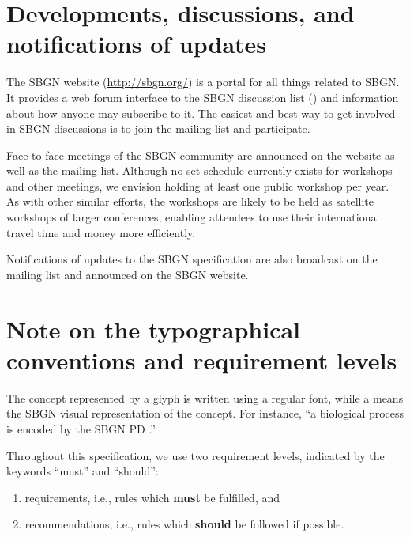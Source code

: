 \section{Developments, discussions, and notifications of updates}
\label{sec:discussions}

The SBGN website (\url{http://sbgn.org/}) is a portal for all things 
related to SBGN.  It provides a web forum interface to the SBGN discussion 
list () and information about how anyone 
may subscribe to it.  The easiest and best way to get involved in SBGN 
discussions is to join the mailing list and participate.

Face-to-face meetings of the SBGN community are announced on the website as 
well as the mailing list.  Although no set schedule currently exists for 
workshops and other meetings, we envision holding at least one public 
workshop per year.  As with other similar efforts, the workshops are likely 
to be held as satellite workshops of larger conferences, enabling attendees 
to use their international travel time and money more efficiently.

Notifications of updates to the SBGN specification are also broadcast on 
the mailing list and announced on the SBGN website.

\section{Note on the typographical conventions and requirement levels}
\label{sec:notes}
The concept represented by a glyph is written using a regular font, while a 
 means the SBGN visual representation of the concept. For 
instance, ``a biological process is encoded by the SBGN PD .''

Throughout this specification, we use two requirement levels, indicated by the keywords ``must'' and ``should'':
\begin{enumerate}
  \item requirements, i.e., rules which \textbf{must} be fulfilled, and
  \item recommendations, i.e., rules which \textbf{should} be followed if
  possible. 
\end{enumerate}